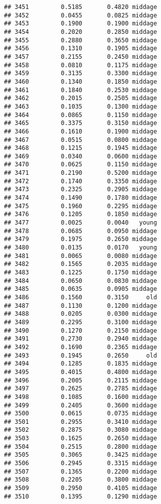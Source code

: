 \documentclass[
]{article}
\begin{document}
\begin{verbatim}
## 3451         0.5185       0.4820 middage
## 3452         0.0455       0.0825 middage
## 3453         0.1900       0.1900 middage
## 3454         0.2020       0.2850 middage
## 3455         0.2880       0.3650 middage
## 3456         0.1310       0.1905 middage
## 3457         0.2155       0.2450 middage
## 3458         0.0810       0.1175 middage
## 3459         0.3135       0.3300 middage
## 3460         0.1340       0.1850 middage
## 3461         0.1840       0.2530 middage
## 3462         0.2015       0.2505 middage
## 3463         0.1035       0.1300 middage
## 3464         0.0865       0.1150 middage
## 3465         0.3375       0.3150 middage
## 3466         0.1610       0.1900 middage
## 3467         0.0515       0.0800 middage
## 3468         0.1215       0.1945 middage
## 3469         0.0340       0.0600 middage
## 3470         0.0625       0.1150 middage
## 3471         0.2190       0.5200 middage
## 3472         0.1740       0.3350 middage
## 3473         0.2325       0.2905 middage
## 3474         0.1490       0.1780 middage
## 3475         0.1960       0.2295 middage
## 3476         0.1205       0.1850 middage
## 3477         0.0025       0.0040   young
## 3478         0.0685       0.0950 middage
## 3479         0.1975       0.2650 middage
## 3480         0.0135       0.0170   young
## 3481         0.0065       0.0080 middage
## 3482         0.1565       0.2035 middage
## 3483         0.1225       0.1750 middage
## 3484         0.0650       0.0830 middage
## 3485         0.0635       0.0905 middage
## 3486         0.1560       0.3150     old
## 3487         0.1130       0.1200 middage
## 3488         0.0205       0.0300 middage
## 3489         0.2295       0.3100 middage
## 3490         0.1270       0.2150 middage
## 3491         0.2730       0.2940 middage
## 3492         0.1690       0.2365 middage
## 3493         0.1945       0.2650     old
## 3494         0.1285       0.1835 middage
## 3495         0.4015       0.4800 middage
## 3496         0.2005       0.2115 middage
## 3497         0.2625       0.2785 middage
## 3498         0.1085       0.1600 middage
## 3499         0.2405       0.3600 middage
## 3500         0.0615       0.0735 middage
## 3501         0.2955       0.3410 middage
## 3502         0.2875       0.3080 middage
## 3503         0.1625       0.2650 middage
## 3504         0.2515       0.2800 middage
## 3505         0.3065       0.3425 middage
## 3506         0.2945       0.3315 middage
## 3507         0.1365       0.2200 middage
## 3508         0.2205       0.3800 middage
## 3509         0.2950       0.4105 middage
## 3510         0.1395       0.1290 middage

\end{verbatim}
\end{document}
